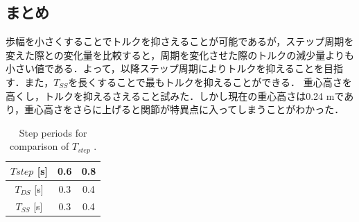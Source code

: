 \documentclass[twocolumn]{jsarticle}
\begin{document}
\subsection{まとめ}
歩幅を小さくすることでトルクを抑さえることが可能であるが，ステップ周期を変えた際との変化量を比較すると，周期を変化させた際のトルクの減少量よりも小さい値である．よって，以降ステップ周期によりトルクを抑えることを目指す．また，$T_{SS}$を長くすることで最もトルクを抑えることができる．
重心高さを高くし，トルクを抑えるさえること試みた．しかし現在の重心高さは0.24 mであり，重心高さをさらに上げると関節が特異点に入ってしまうことがわかった．%
\begin{table}[h]
  \centering
  \caption{Step periods for comparison of $T_{step}$ .}
  \vspace{-2mm}
  \begin{tabular}[t]{|c||c|c|}
    \hline
    $Tstep$ [s]& 0.6 & 0.8 \\ \hline
    $T_{DS}$ [s]& 0.3 & 0.4 \\ \hline
    $T_{SS}$ [s]& 0.3 & 0.4 \\ \hline
  \end{tabular}
  \label{tab:table2}
\end{table}
\end{document}
